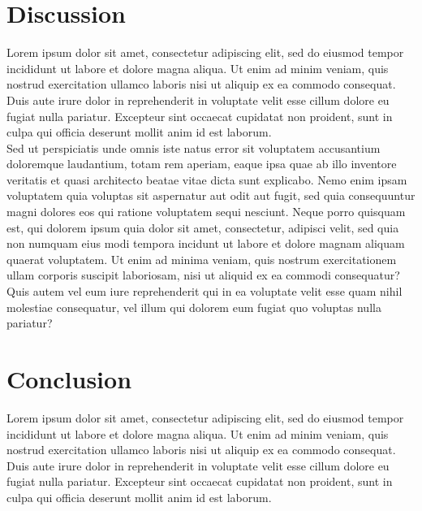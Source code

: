 \documentclass[a4paper,12pt]{article}
\theoremstyle{mytheor}
\begin{document}
    \section{Discussion}
        Lorem ipsum dolor sit amet, consectetur adipiscing elit, sed do eiusmod tempor incididunt ut labore et dolore magna aliqua. Ut enim ad minim veniam, quis nostrud exercitation ullamco laboris nisi ut aliquip ex ea commodo consequat. Duis aute irure dolor in reprehenderit in voluptate velit esse cillum dolore eu fugiat nulla pariatur. Excepteur sint occaecat cupidatat non proident, sunt in culpa qui officia deserunt mollit anim id est laborum.\\
                
        \noindent Sed ut perspiciatis unde omnis iste natus error sit voluptatem accusantium doloremque laudantium, totam rem aperiam, eaque ipsa quae ab illo inventore veritatis et quasi architecto beatae vitae dicta sunt explicabo. Nemo enim ipsam voluptatem quia voluptas sit aspernatur aut odit aut fugit, sed quia consequuntur magni dolores eos qui ratione voluptatem sequi nesciunt. Neque porro quisquam est, qui dolorem ipsum quia dolor sit amet, consectetur, adipisci velit, sed quia non numquam eius modi tempora incidunt ut labore et dolore magnam aliquam quaerat voluptatem. Ut enim ad minima veniam, quis nostrum exercitationem ullam corporis suscipit laboriosam, nisi ut aliquid ex ea commodi consequatur? Quis autem vel eum iure reprehenderit qui in ea voluptate velit esse quam nihil molestiae consequatur, vel illum qui dolorem eum fugiat quo voluptas nulla pariatur?
    \pagebreak
    \section{Conclusion}
        Lorem ipsum dolor sit amet, consectetur adipiscing elit, sed do eiusmod tempor incididunt ut labore et dolore magna aliqua. Ut enim ad minim veniam, quis nostrud exercitation ullamco laboris nisi ut aliquip ex ea commodo consequat. Duis aute irure dolor in reprehenderit in voluptate velit esse cillum dolore eu fugiat nulla pariatur. Excepteur sint occaecat cupidatat non proident, sunt in culpa qui officia deserunt mollit anim id est laborum.\\
                
\end{document}
